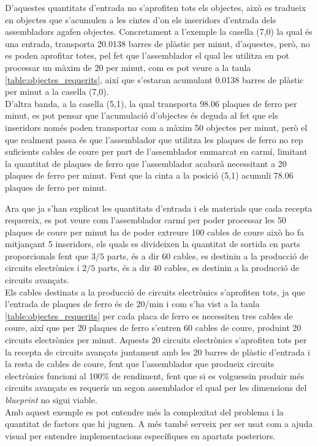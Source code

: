 D'aquestes quantitats d'entrada no s'aprofiten tots els objectes, això es tradueix en objectes que s'acumulen a les cintes d'on els inseridors d'entrada dels assembladors agafen objectes. Concretament a l'exemple la casella (7,0) la qual és una entrada, transporta 20.0138 barres de plàstic per minut, d'aquestes, però, no es poden aprofitar totes, pel fet que l'assemblador el qual les utilitza en pot processar un màxim de 20 per minut, com es pot veure a la taula \ref{table:objectes_requerits}, així que s'estaran acumulant 0.0138 barres de plàstic per minut a la casella (7,0).\\
D'altra banda, a la casella (5,1), la qual transporta 98.06 plaques de ferro per minut, es pot pensar que l'acumulació d'objectes és deguda al fet que els inseridors només poden transportar com a màxim 50 objectes per minut, però el que realment passa és que l'assemblador que utilitza les plaques de ferro no rep suficients cables de coure per part de l'assemblador emmarcat en carmí, limitant la quantitat de plaques de ferro que l'assemblador acabarà necessitant a 20 plaques de ferro per minut. Fent que la cinta a la posició (5,1) acumuli 78.06 plaques de ferro per minut. 

Ara que ja s'han explicat les quantitats d'entrada i els materials que cada recepta requereix, es pot veure com l'assemblador carmí per poder processar les 50 plaques de coure per minut ha de poder extreure 100 cables de coure això ho fa mitjançant 5 inseridors, els quals es divideixen la quantitat de sortida en parts proporcionals fent que $3/5$ parts, és a dir 60 cables, es destinin a la producció de circuits electrònics i $2/5$ parts, és a dir 40 cables, es destinin a la producció de circuits avançats.\\
Els cables destinats a la producció de circuits electrònics s'aprofiten tots, ja que l'entrada de plaques de ferro és de 20/min i com s'ha vist a la taula \ref{table:objectes_requerits} per cada placa de ferro es necessiten tres cables de coure, així que per 20 plaques de ferro s'entren 60 cables de coure, produint 20 circuits electrònics per minut. Aquests 20 circuits electrònics s'aprofiten tots per la recepta de circuits avançats juntament amb les 20 barres de plàstic d'entrada i la resta de cables de coure, fent que l'assemblador que produeix circuits electrònics funcioni al 100\% de rendiment, fent que si es volguessin produir més circuits avançats es requerís un segon assemblador el qual per les dimensions del \textit{blueprint} no sigui viable.\\

Amb aquest exemple es pot entendre més la complexitat del problema i la quantitat de factors que hi juguen. A més també serveix per ser usat com a ajuda visual per entendre implementacions específiques en apartats posteriors.


